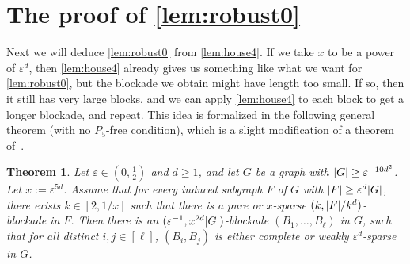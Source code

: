 \documentclass[11pt,reqno,a4paper]{amsart}
\newtheorem{theorem}{Theorem}[section]
\newcommand{\eps}{\varepsilon}
\DeclarePairedDelimiter\abs{\lvert}{\rvert}%
\begin{document}
	\section{The proof of \cref{lem:robust0}} \label{sec:conductors}
	Next we will deduce \cref{lem:robust0} from \cref{lem:house4}. If we take $x$ to be a power of $\eps^d$, then \cref{lem:house4} 
	already gives us something like what we want for \cref{lem:robust0}, but the blockade we obtain might have length too small.
	If so, then it still has very large blocks, and we can apply \cref{lem:house4} to each block to get
	a longer blockade, and repeat. 
	This idea is formalized in the following general theorem (with no $\overline{P_5}$-free condition),  which is 
	a slight modification of a theorem of~\cite{density4}.
	\begin{theorem}
		\label{thm:key}
		Let $\eps\in(0,\frac12)$ and $d\ge1$,
		and let $G$ be a graph with $\abs G\ge \eps^{-10d^2}$.
		Let $x:=\eps^{5d}$.
		Assume that for every induced subgraph $F$ of $G$ with $\abs F\ge \eps^{d}\abs G$, there exists $k\in[2,1/x]$ such that there is a pure or $x$-sparse $(k,\abs F/k^d)$-blockade in $F$.
		Then there is an $(\eps^{-1},{x^{2d}\abs G})$-blockade $(B_1,\ldots,B_{\ell})$ in $G$,
		such that for all distinct $i,j\in[\ell]$, $(B_i,B_j)$ is either complete or weakly $\eps^d$-sparse in $G$.
	\end{theorem}
\end{document}
